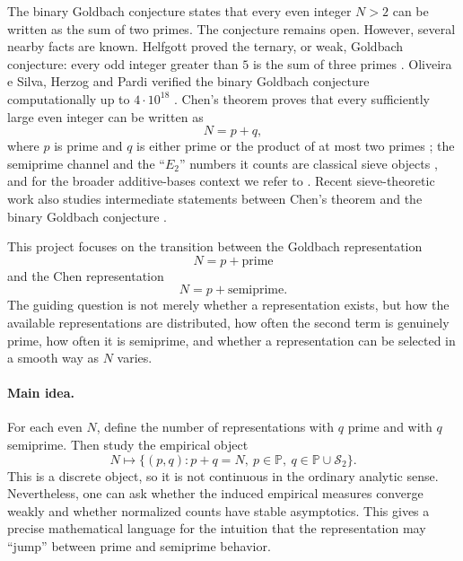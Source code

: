 \documentclass[]{interact}%
\newcommand{\PP}{\mathbb P}
\newcommand{\SSemi}{\mathcal S_2}
\begin{document}
The binary Goldbach conjecture states that every even integer $N>2$ can be written as the sum of two primes. The conjecture remains open. However, several nearby facts are known. Helfgott proved the ternary, or weak, Goldbach conjecture: every odd integer greater than $5$ is the sum of three primes \citep{helf2014ternary}. Oliveira e Silva, Herzog and Pardi verified the binary Goldbach conjecture computationally up to $4\cdot 10^{18}$ \citep{silva2014}. Chen's theorem proves that every sufficiently large even integer can be written as
\[
  N=p+q,
\]
where $p$ is prime and $q$ is either prime or the product of at most two primes \citep{chen1973}; the semiprime channel and the ``$E_2$'' numbers it counts are classical sieve objects \citep{halberstamrichert}, and for the broader additive-bases context we refer to \citet{nathanson}. Recent sieve-theoretic work also studies intermediate statements between Chen's theorem and the binary Goldbach conjecture \citep{li2026}.

This project focuses on the transition between the Goldbach representation
\[
  N = p + \text{prime}
\]
and the Chen representation
\[
  N = p + \text{semiprime}.
\]
The guiding question is not merely whether a representation exists, but how the available representations are distributed, how often the second term is genuinely prime, how often it is semiprime, and whether a representation can be selected in a smooth way as $N$ varies.

\paragraph{Main idea.}
For each even $N$, define the number of representations with $q$ prime and with $q$ semiprime. Then study the empirical object
\[
  N \longmapsto \{(p,q): p+q=N,\ p\in\PP,\ q\in \PP\cup\SSemi\}.
\]
This is a discrete object, so it is not continuous in the ordinary analytic sense. Nevertheless, one can ask whether the induced empirical measures converge weakly and whether normalized counts have stable asymptotics. This gives a precise mathematical language for the intuition that the representation may ``jump'' between prime and semiprime behavior.
\end{document}
